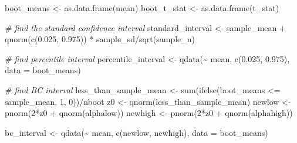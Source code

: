 \documentclass[12pt]{article}
\newenvironment{Shaded}{\begin{snugshade}}{\end{snugshade}}
\newcommand{\AttributeTok}[1]{\textcolor[rgb]{0.77,0.63,0.00}{#1}}
\newcommand{\CommentTok}[1]{\textcolor[rgb]{0.56,0.35,0.01}{\textit{#1}}}
\newcommand{\DecValTok}[1]{\textcolor[rgb]{0.00,0.00,0.81}{#1}}
\newcommand{\FloatTok}[1]{\textcolor[rgb]{0.00,0.00,0.81}{#1}}
\newcommand{\FunctionTok}[1]{\textcolor[rgb]{0.00,0.00,0.00}{#1}}
\newcommand{\NormalTok}[1]{#1}
\newcommand{\OtherTok}[1]{\textcolor[rgb]{0.56,0.35,0.01}{#1}}
\newcommand{\SpecialCharTok}[1]{\textcolor[rgb]{0.00,0.00,0.00}{#1}}
\begin{document}
\begin{Shaded}
\begin{Highlighting}[]
\NormalTok{  boot\_means }\OtherTok{\textless{}{-}} \FunctionTok{as.data.frame}\NormalTok{(mean)}
\NormalTok{  boot\_t\_stat }\OtherTok{\textless{}{-}} \FunctionTok{as.data.frame}\NormalTok{(t\_stat)}
  
  \CommentTok{\# find the standard confidence interval}
\NormalTok{  standard\_interval }\OtherTok{\textless{}{-}}\NormalTok{ sample\_mean }\SpecialCharTok{+} 
    \FunctionTok{qnorm}\NormalTok{(}\FunctionTok{c}\NormalTok{(}\FloatTok{0.025}\NormalTok{, }\FloatTok{0.975}\NormalTok{)) }\SpecialCharTok{*}\NormalTok{ sample\_sd}\SpecialCharTok{/}\FunctionTok{sqrt}\NormalTok{(sample\_n)}
  
  \CommentTok{\# find percentile interval}
\NormalTok{  percentile\_interval }\OtherTok{\textless{}{-}} \FunctionTok{qdata}\NormalTok{(}\SpecialCharTok{\textasciitilde{}}\NormalTok{ mean, }\FunctionTok{c}\NormalTok{(}\FloatTok{0.025}\NormalTok{, }\FloatTok{0.975}\NormalTok{), }\AttributeTok{data =}\NormalTok{ boot\_means)}
  
  \CommentTok{\# find BC interval}
\NormalTok{  less\_than\_sample\_mean }\OtherTok{\textless{}{-}} \FunctionTok{sum}\NormalTok{(}\FunctionTok{ifelse}\NormalTok{(boot\_means }\SpecialCharTok{\textless{}=}\NormalTok{ sample\_mean, }\DecValTok{1}\NormalTok{, }\DecValTok{0}\NormalTok{))}\SpecialCharTok{/}\NormalTok{nboot}
\NormalTok{  z0 }\OtherTok{\textless{}{-}} \FunctionTok{qnorm}\NormalTok{(less\_than\_sample\_mean)}
\NormalTok{  newlow }\OtherTok{\textless{}{-}} \FunctionTok{pnorm}\NormalTok{(}\DecValTok{2}\SpecialCharTok{*}\NormalTok{z0 }\SpecialCharTok{+} \FunctionTok{qnorm}\NormalTok{(alphalow))}
\NormalTok{  newhigh }\OtherTok{\textless{}{-}} \FunctionTok{pnorm}\NormalTok{(}\DecValTok{2}\SpecialCharTok{*}\NormalTok{z0 }\SpecialCharTok{+} \FunctionTok{qnorm}\NormalTok{(alphahigh))}

\NormalTok{  bc\_interval }\OtherTok{\textless{}{-}} \FunctionTok{qdata}\NormalTok{(}\SpecialCharTok{\textasciitilde{}}\NormalTok{ mean, }\FunctionTok{c}\NormalTok{(newlow, newhigh), }\AttributeTok{data =}\NormalTok{ boot\_means)}
  

\end{Highlighting}
\end{Shaded}
\end{document}
